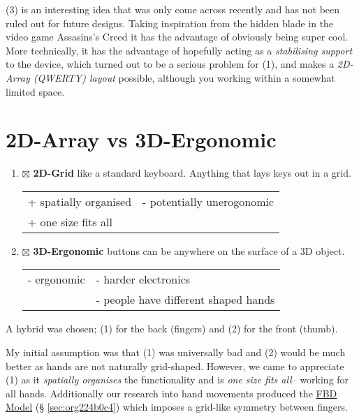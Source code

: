 \documentclass[logo,bsc,singlespacing,parskip]{infthesis}
\begin{document}
(3) is an interesting idea that was only come across recently and has not been ruled out for future designs.
Taking inspiration from the hidden blade in the video game Assasins's Creed it has the advantage of obviously being super cool.
More technically, it has the advantage of hopefully acting as a \emph{stabilising support} to the device, which turned out to be a serious problem for (1), and makes a \emph{2D-Array (QWERTY) layout} possible, although you working within a somewhat limited space.
\section{2D-Array vs 3D-Ergonomic}
\label{sec:org3957daa}
\begin{enumerate}
\item{$\boxtimes$} \textbf{2D-Grid} like a standard keyboard. Anything that lays keys out in a grid.
\begin{longtable}{|p{6.25cm}|p{6.25cm}|}
\hline
+ spatially organised & - potentially unerogonomic\\
+ one size fits all & \\
\hline
\end{longtable}
\item{$\boxtimes$} \textbf{3D-Ergonomic} buttons can be anywhere on the surface of a 3D object.
\begin{longtable}{|p{6.25cm}|p{6.25cm}|}
\hline
- ergonomic & - harder electronics\\
 & - people have different shaped hands\\
\hline
\end{longtable}
\end{enumerate}

A hybrid was chosen; (1) for the back (fingers) and (2) for the front (thumb).

My initial assumption was that (1) was universally bad and (2) would be much better as hands are not naturally grid-shaped.
However, we came to appreciate (1) as it \emph{spatially organises} the functionality and is \emph{one size fits all}-- working for all hands.
Additionally our research into hand movements produced the \hyperref[sec:org224b0c4]{FBD Model} (§ \ref{sec:org224b0c4}) which imposes a grid-like symmetry between fingers.
\end{document}
